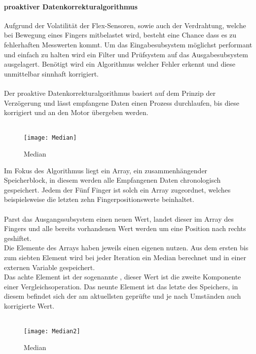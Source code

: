 \documentclass[titlepage,12pt,twoside]{article}
\begin{document}
\paragraph{proaktiver Datenkorrekturalgorithmus}
\label{par:proaktiver Datenkorrekturalgorithmus}
\hfill \break
\hfill \break
Aufgrund der Volatilität der Flex-Sensoren, sowie auch der Verdrahtung, welche bei Bewegung eines Fingers mitbelastet wird, besteht eine Chance dass es 
zu fehlerhaften Messwerten kommt. Um das Eingabesubsystem möglichst performant und einfach zu halten wird ein Filter und Prüfsystem auf das 
Ausgabesubsystem ausgelagert. Benötigt wird ein Algorithmus welcher Fehler erkennt und diese unmittelbar sinnhaft korrigiert. \\
\\
Der proaktive Datenkorrekturalgorithmus basiert auf dem Prinzip der Verzögerung und lässt empfangene Daten einen Prozess durchlaufen, bis diese korrigiert 
und an den Motor übergeben werden. \\
\\
\begin{figure}[H]
	\begin{center}
		\scalebox{0.8}
		{\texttt{[image: Median]}}
		\caption{Median}
		\label{fig:Median}		
	\end{center}
\end{figure}
\hfill \break
Im Fokus des Algorithmus liegt ein Array, ein zusammenhängender Speicherblock, in diesem werden alle Empfangenen Daten chronologisch gespeichert. Jedem 
der Fünf Finger ist solch ein Array zugeordnet, welches beispielsweise die letzten zehn Fingerpositionswerte beinhaltet. \\
\\
Parst das Ausgangssubsystem einen neuen Wert, landet dieser im Array des Fingers und alle bereits vorhandenen Wert werden um eine Position nach rechts 
geshiftet. \\
Die Elemente des Arrays haben jeweils einen eigenen nutzen. Aus dem ersten bis zum siebten Element wird bei jeder Iteration ein Median berechnet und in 
einer externen Variable gespeichert. \\
Das achte Element ist der sogenannte , dieser Wert ist die zweite Komponente einer Vergleichsoperation. Das neunte Element ist das letzte des 
Speichers, in diesem befindet sich der am aktuellsten geprüfte und je nach Umständen auch korrigierte Wert. \\
\\
\begin{figure}[H]
	\begin{center}
		\scalebox{0.8}
		{\texttt{[image: Median2]}}
		\caption{Median}
		\label{fig:Median2}		
	\end{center}
\end{figure}
\end{document}
